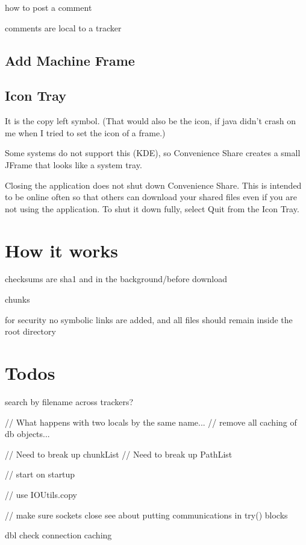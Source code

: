 \documentclass{article}
\begin{document}
how to post a comment

comments are local to a tracker

\subsection{Add Machine Frame}

\subsection{Icon Tray}

It is the copy left symbol.
(That would also be the icon, if java didn't crash on me when I tried to set the icon of a frame.)

Some systems do not support this (KDE), so Convenience Share creates a small JFrame that looks like a system tray.

Closing the application does not shut down Convenience Share.
This is intended to be online often so that others can download your shared files even if you are not using the application.
To shut it down fully, select Quit from the Icon Tray.

\section{How it works}

checksums are sha1 and in the background/before download

chunks

for security no symbolic links are added, and all files should remain inside the root directory


\section {Todos}
search by filename across trackers?




		// What happens with two locals by the same name...
		// remove all caching of db objects...
		
        // Need to break up chunkList
        // Need to break up PathList

        // start on startup
        
		// use IOUtils.copy
        
        // make sure sockets close
 see about putting communications in try() {} blocks
 
dbl check connection caching
 
\end{document}
